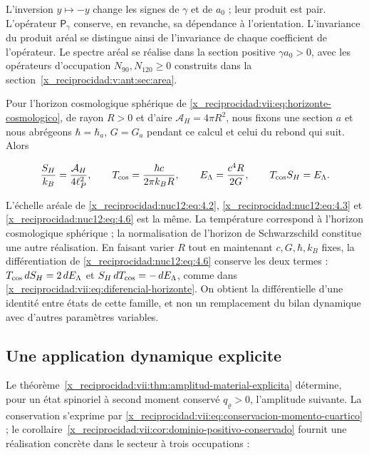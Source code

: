 L’inversion \(y\mapsto-y\) change les signes de \(\gamma\) et de \(a_0\) ; leur produit est pair. L’opérateur \(\mathsf P_\gamma\) conserve, en revanche, sa dépendance à l’orientation. L’invariance du produit aréal se distingue ainsi de l’invariance de chaque coefficient de l’opérateur. Le spectre aréal se réalise dans la section positive \(\gamma a_0>0\), avec les opérateurs d’occupation \(N_{90},N_{120}\geq0\) construits dans la section~\ref{x_reciprocidad:v:ant:sec:area}.

Pour l’horizon cosmologique sphérique de \eqref{x_reciprocidad:vii:eq:horizonte-cosmologico}, de rayon \(R>0\) et d’aire \(\mathcal A_H=4\pi R^2\), nous fixons une section \(a\) et nous abrégeons \(\hbar=\hbar_a\), \(G=G_a\) pendant ce calcul et celui du rebond qui suit. Alors



\begin{equation}
\frac{S_H}{k_B}=\frac{\mathcal A_H}{4\ell_P^2},\qquad
T_{\rm cos}=\frac{\hbar c}{2\pi k_BR},\qquad
E_\Lambda=\frac{c^4R}{2G},\qquad T_{\rm cos}S_H=E_\Lambda .
\label{x_reciprocidad:nuc12:eq:4.6}
\end{equation}



L’échelle aréale de \eqref{x_reciprocidad:nuc12:eq:4.2}, \eqref{x_reciprocidad:nuc12:eq:4.3} et \eqref{x_reciprocidad:nuc12:eq:4.6} est la même. La température correspond à l’horizon cosmologique sphérique ; la normalisation de l’horizon de Schwarzschild constitue une autre réalisation. En faisant varier \(R\) tout en maintenant \(c,G,\hbar,k_B\) fixes, la différentiation de \eqref{x_reciprocidad:nuc12:eq:4.6} conserve les deux termes : \(T_{\rm cos}\,dS_H=2\,dE_\Lambda\) et \(S_H\,dT_{\rm cos}=-\,dE_\Lambda\), comme dans \eqref{x_reciprocidad:vii:eq:diferencial-horizonte}. On obtient la différentielle d’une identité entre états de cette famille, et non un remplacement du bilan dynamique avec d’autres paramètres variables.

\subsection{Une application dynamique explicite}

Le théorème~\ref{x_reciprocidad:vii:thm:amplitud-material-explicita} détermine, pour un état spinoriel à second moment conservé \(q_\varrho>0\), l’amplitude suivante. La conservation s’exprime par \eqref{x_reciprocidad:vii:eq:conservacion-momento-cuartico} ; le corollaire~\ref{x_reciprocidad:vii:cor:dominio-positivo-conservado} fournit une réalisation concrète dans le secteur à trois occupations :



